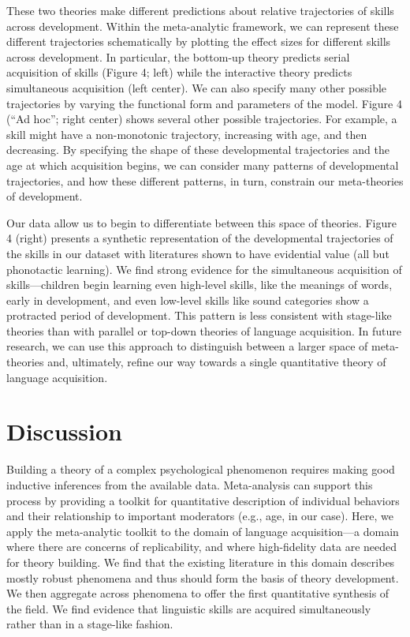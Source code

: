 \documentclass[english,floatsintext,man]{apa6}
\theoremstyle{definition}
\theoremstyle{definition}
\theoremstyle{remark}
\begin{document}
These two theories make different predictions about relative
trajectories of skills across development. Within the meta-analytic
framework, we can represent these different trajectories schematically
by plotting the effect sizes for different skills across development. In
particular, the bottom-up theory predicts serial acquisition of skills
(Figure 4; left) while the interactive theory predicts simultaneous
acquisition (left center). We can also specify many other possible
trajectories by varying the functional form and parameters of the model.
Figure 4 (\enquote{Ad hoc}; right center) shows several other possible
trajectories. For example, a skill might have a non-monotonic
trajectory, increasing with age, and then decreasing. By specifying the
shape of these developmental trajectories and the age at which
acquisition begins, we can consider many patterns of developmental
trajectories, and how these different patterns, in turn, constrain our
meta-theories of development.

Our data allow us to begin to differentiate between this space of
theories. Figure 4 (right) presents a synthetic representation of the
developmental trajectories of the skills in our dataset with literatures
shown to have evidential value (all but phonotactic learning). We find
strong evidence for the simultaneous acquisition of skills---children
begin learning even high-level skills, like the meanings of words, early
in development, and even low-level skills like sound categories show a
protracted period of development. This pattern is less consistent with
stage-like theories than with parallel or top-down theories of language
acquisition. In future research, we can use this approach to distinguish
between a larger space of meta-theories and, ultimately, refine our way
towards a single quantitative theory of language acquisition.

\section{Discussion}\label{discussion}

Building a theory of a complex psychological phenomenon requires making
good inductive inferences from the available data. Meta-analysis can
support this process by providing a toolkit for quantitative description
of individual behaviors and their relationship to important moderators
(e.g., age, in our case). Here, we apply the meta-analytic toolkit to
the domain of language acquisition---a domain where there are concerns
of replicability, and where high-fidelity data are needed for theory
building. We find that the existing literature in this domain describes
mostly robust phenomena and thus should form the basis of theory
development. We then aggregate across phenomena to offer the first
quantitative synthesis of the field. We find evidence that linguistic
skills are acquired simultaneously rather than in a stage-like fashion.
\end{document}
